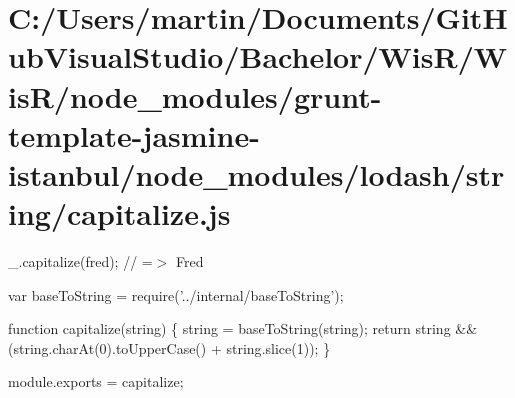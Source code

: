 \hypertarget{_c_1_2_users_2martin_2_documents_2_git_hub_visual_studio_2_bachelor_2_wis_r_2_wis_r_2node_modulec1895845049934dc5cc9c87570f3f021}{}\section{C\+:/\+Users/martin/\+Documents/\+Git\+Hub\+Visual\+Studio/\+Bachelor/\+Wis\+R/\+Wis\+R/node\+\_\+modules/grunt-\/template-\/jasmine-\/istanbul/node\+\_\+modules/lodash/string/capitalize.\+js}
\+\_\+.\+capitalize(\textquotesingle{}fred\textquotesingle{}); // =$>$ \textquotesingle{}Fred\textquotesingle{}


\begin{DoxyCodeInclude}
var baseToString = require(\textcolor{stringliteral}{'../internal/baseToString'});

\textcolor{keyword}{function} capitalize(\textcolor{keywordtype}{string}) \{
  \textcolor{keywordtype}{string} = baseToString(\textcolor{keywordtype}{string});
  \textcolor{keywordflow}{return} \textcolor{keywordtype}{string} && (\textcolor{keywordtype}{string}.charAt(0).toUpperCase() + \textcolor{keywordtype}{string}.slice(1));
\}

module.exports = capitalize;
\end{DoxyCodeInclude}
 